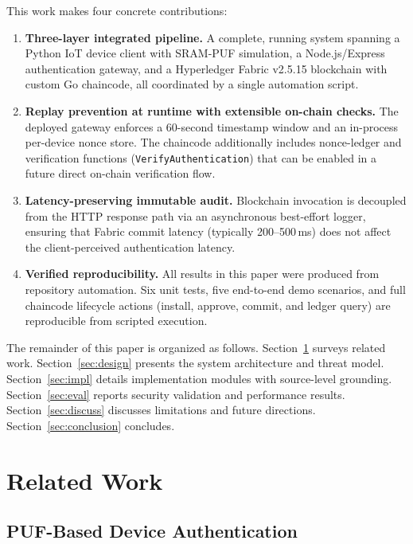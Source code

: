 \documentclass[conference]{IEEEtran}
\begin{document}
This work makes four concrete contributions:

\begin{enumerate}
\item \textbf{Three-layer integrated pipeline.} A complete, running system spanning a Python IoT device client with SRAM-PUF simulation, a Node.js/Express authentication gateway, and a Hyperledger Fabric v2.5.15 blockchain with custom Go chaincode, all coordinated by a single automation script.

\item \textbf{Replay prevention at runtime with extensible on-chain checks.} The deployed gateway enforces a 60-second timestamp window and an in-process per-device nonce store. The chaincode additionally includes nonce-ledger and verification functions (\texttt{VerifyAuthentication}) that can be enabled in a future direct on-chain verification flow.

\item \textbf{Latency-preserving immutable audit.} Blockchain invocation is decoupled from the HTTP response path via an asynchronous best-effort logger, ensuring that Fabric commit latency (typically 200--500\,ms) does not affect the client-perceived authentication latency.

\item \textbf{Verified reproducibility.} All results in this paper were produced from repository automation. Six unit tests, five end-to-end demo scenarios, and full chaincode lifecycle actions (install, approve, commit, and ledger query) are reproducible from scripted execution.
\end{enumerate}

The remainder of this paper is organized as follows. Section~\ref{sec:related} surveys related work. Section~\ref{sec:design} presents the system architecture and threat model. Section~\ref{sec:impl} details implementation modules with source-level grounding. Section~\ref{sec:eval} reports security validation and performance results. Section~\ref{sec:discuss} discusses limitations and future directions. Section~\ref{sec:conclusion} concludes.

\section{Related Work}
\label{sec:related}

\subsection{PUF-Based Device Authentication}
\end{document}
